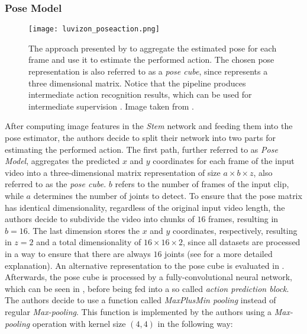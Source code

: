 \subsubsection{Pose Model}
\label{sec:pose_based_action_recognition}
\begin{figure}[htb!]
    \centering
    \texttt{[image: luvizon\_poseaction.png]}
    \caption{The approach presented by \cite{luvizon_2d/3d_2018} to aggregate the estimated pose for each frame and use it to estimate the performed action. The chosen pose representation is also referred to as a \textit{pose cube}, since represents a three dimensional matrix. Notice that the pipeline produces intermediate action recognition results, which can be used for intermediate supervision . Image taken from \cite{luvizon_2d/3d_2018}.}
    \label{fig:luvizon_poseaction}
\end{figure}

After computing image features in the \textit{Stem} network and feeding them into the pose estimator, the authors decide to split their network into two parts for estimating the performed action.
The first path, further referred to as \textit{Pose Model}, aggregates the predicted $x$ and $y$ coordinates for each frame of the input video into a three-dimensional matrix representation of size $a \times b \times z$, also referred to as the \textit{pose cube}.
$b$ refers to the number of frames of the input clip, while $a$ determines the number of joints to detect.
To ensure that the pose matrix has identical dimensionality, regardless of the original input video length, the authors decide to subdivide the video into chunks of $16$ frames, resulting in $b=16$.
The last dimension stores the $x$ and $y$ coordinates, respectively, resulting in $z=2$ and a total dimensionality of $16 \times 16 \times 2$, since all datasets are processed in a way to ensure that there are always $16$ joints (see  for a more detailed explanation).
An alternative representation to the pose cube is evaluated in .
Afterwards, the pose cube is processed by a fully-convolutional neural network, which can be seen in , before being fed into a so called \textit{action prediction block}.
The authors decide to use a function called \textit{MaxPlusMin pooling} instead of regular \textit{Max-pooling}.
This function is implemented by the authors using a \textit{Max-pooling} operation with kernel size $(4,4)$ in the following way:

